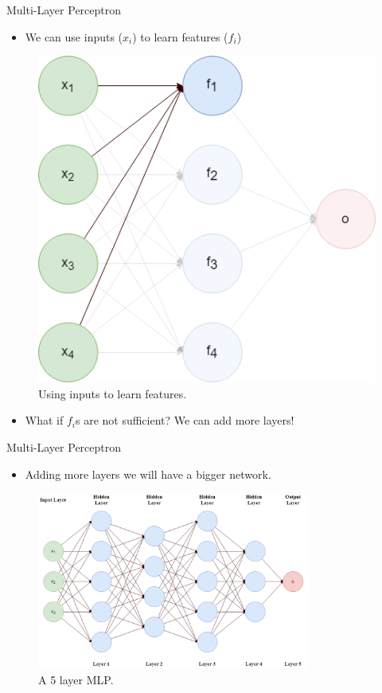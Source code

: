 \documentclass[compress,oilve,t]{beamer}
\begin{document}
\begin{frame}{Multi-Layer Perceptron}
	\begin{itemize}
		\item We can use inputs ($x_i$) to learn features ($f_i$)
	\end{itemize}
	\begin{figure}[H]
		\centering
		\includegraphics[height=0.45\textheight]{Figs/learn_features.png}
		\caption{Using inputs to learn features.}
	\end{figure}
	\begin{itemize}
		\item What if $f_i$s are not sufficient? We can add more layers!
	\end{itemize}
\end{frame}

\begin{frame}{Multi-Layer Perceptron}
	\begin{itemize}
		\item Adding more layers we will have a bigger network.
	\end{itemize}
	\begin{figure}[H]
		\centering
		\includegraphics[width=0.8\textwidth]{Figs/5layer_mlp.png}
		\caption{A 5 layer MLP.}
	\end{figure}
\end{frame}
\end{document}

